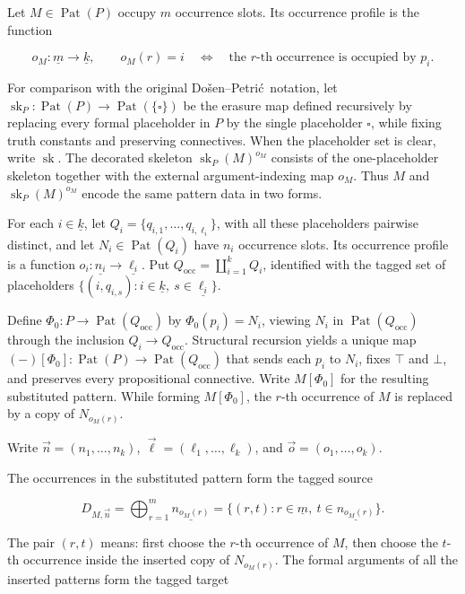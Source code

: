 \documentclass[11pt]{article}
\newcommand{\finord}[1]{\underline{#1}}
\newcommand{\DP}{Do\v{s}en--Petri\'{c}}
\begin{document}
Let \(M\in\operatorname{Pat}(P)\) occupy \(m\) occurrence slots. Its
occurrence profile is the function

\[
o_M:\finord m\longrightarrow\finord k,
\qquad
o_M(r)=i
\quad\Longleftrightarrow\quad
\text{the \(r\)-th occurrence is occupied by \(p_i\)}.
\]

For comparison with the original \DP\ notation, let
\(\operatorname{sk}_P:\operatorname{Pat}(P)\to
\operatorname{Pat}(\{\square\})\) be the erasure map defined recursively by
replacing every formal placeholder in \(P\) by the single placeholder
\(\square\), while fixing truth constants and preserving connectives. When
the placeholder set is clear, write \(\operatorname{sk}\). The decorated
skeleton \(\operatorname{sk}_P(M)^{o_M}\) consists of the one-placeholder
skeleton together with the external argument-indexing map \(o_M\). Thus
\(M\) and \(\operatorname{sk}_P(M)^{o_M}\) encode the same pattern data in
two forms.

For each \(i\in\finord k\), let
\(Q_i=\{q_{i,1},\ldots,q_{i,\ell_i}\}\), with all these placeholders pairwise
distinct, and let \(N_i\in\operatorname{Pat}(Q_i)\) have \(n_i\) occurrence
slots. Its occurrence profile is a function
\(o_i:\finord{n_i}\to\finord{\ell_i}\). Put
\(Q_{\mathrm{occ}}=\coprod_{i=1}^k Q_i\), identified with the tagged set of placeholders
\(\{(i,q_{i,s}):i\in\finord k,\ s\in\finord{\ell_i}\}\).

Define \(\Phi_0:P\to\operatorname{Pat}(Q_{\mathrm{occ}})\) by
\(\Phi_0(p_i)=N_i\), viewing \(N_i\) in
\(\operatorname{Pat}(Q_{\mathrm{occ}})\) through the
inclusion \(Q_i\to Q_{\mathrm{occ}}\). Structural recursion yields a unique map
\((-)[\Phi_0]:\operatorname{Pat}(P)\to
\operatorname{Pat}(Q_{\mathrm{occ}})\) that sends each
\(p_i\) to \(N_i\), fixes \(\top\) and \(\bot\), and preserves every
propositional connective. Write \(M[\Phi_0]\) for the resulting substituted
pattern. While forming \(M[\Phi_0]\), the \(r\)-th occurrence of \(M\) is
replaced by a copy of \(N_{o_M(r)}\).

Write \(\vec n=(n_1,\ldots,n_k)\),
\(\vec\ell=(\ell_1,\ldots,\ell_k)\), and
\(\vec o=(o_1,\ldots,o_k)\).

The occurrences in the substituted pattern form the tagged source

\[
D_{M,\vec n}
=\bigoplus_{r=1}^{m}\finord{n_{o_M(r)}}
=\{(r,t):r\in\finord m,\ t\in\finord{n_{o_M(r)}}\}.
\]

The pair \((r,t)\) means: first choose the \(r\)-th occurrence of \(M\), then
choose the \(t\)-th occurrence inside the inserted copy of
\(N_{o_M(r)}\). The formal arguments of all the inserted patterns form the
tagged target
\end{document}

